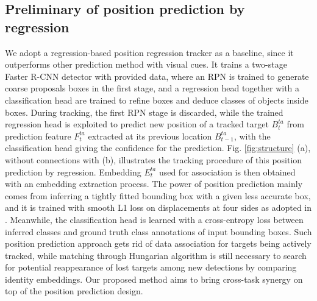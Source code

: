 \documentclass[final]{cvpr}
\begin{document}
\subsection{Preliminary of position prediction by regression}
\label{sec:preliminary}
We adopt a regression-based position regression tracker \cite{Bergmann2019a} as a baseline, since it outperforms other prediction method with visual cues. It trains a two-stage Faster R-CNN detector with provided data, where an RPN is trained to generate coarse proposals boxes in the first stage, and a regression head together with a classification head are trained to refine boxes and deduce classes of objects inside boxes. During tracking, the first RPN stage is discarded, while the trained regression head is exploited to predict new position of a tracked target \(B^{ta}_t\) from prediction feature \(F^{ta}_t\) extracted at its previous location \(B^{ta}_{t-1}\), with the classification head giving the confidence for the prediction. Fig. \ref{fig:structure} (a), without connections with (b), illustrates the tracking procedure of this position prediction by regression. Embedding \(E^{ta}_t\) used for association is then obtained with an embedding extraction process. The power of position prediction mainly comes from inferring a tightly fitted bounding box with a given less accurate box, and it is trained with smooth L1 loss on displacements at four sides as adopted in \cite{Ren2015}.
Meanwhile, the classification head is learned with a cross-entropy loss between inferred classes and ground truth class annotations of input bounding boxes. Such position prediction approach gets rid of data association for targets being actively tracked, while matching through Hungarian algorithm is still necessary to search for potential reappearance of lost targets among new detections by comparing identity embeddings. Our proposed method aims to bring cross-task synergy on top of the position prediction design.
\end{document}
